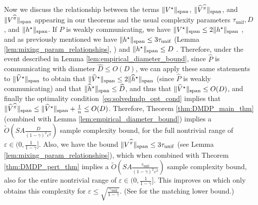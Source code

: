 \documentclass{article}
\theoremstyle{plain}
\theoremstyle{plain}
\theoremstyle{remark}
\theoremstyle{plain}
\theoremstyle{plain}
\newcommand{\Phat}{\widehat{P}}
\newcommand{\Vhat}{\widehat{V}}
\newcommand{\pihat}{\widehat{\pi}}
\newcommand{\hhat}{\widehat{h}}
\newcommand{\Otilde}{\widetilde{O}}
\newcommand{\tmix}{\tau_{\mathrm{unif}}}
\begin{document}
Now we discuss the relationship between the terms $\Vert V^\star\Vert _{\textnormal{span}}$, $\spannorm{\Vhat^{\pihat}}$, and $\spannorm{V^{\pihat}}$ appearing in our theorems and the usual complexity parameters $\tmix, D$, and $\Vert h^\star\Vert _{\textnormal{span}}$. If $P$ is weakly communicating, we have $\Vert V^\star\Vert _{\textnormal{span}} \leq 2\Vert h^\star\Vert _{\textnormal{span}}$ \citep[Lemma 2]{wei_model-free_2020}, and as previously mentioned we have $\spannorm{h^\star} \leq 3 \tmix$ (Lemma \ref{lem:mixing_param_relationships}, \cite{wang_near_2022}) and $\Vert h^\star\Vert _{\textnormal{span}} \leq D$ \citep{bartlett_regal_2012, lattimore_bandit_2020}. Therefore, under the event described in Lemma \ref{lem:empirical_diameter_bound}, since $\Phat$ is communicating with diameter $\widehat{D} \leq O(D)$, we can apply these same statements to $\spannorm{\Vhat^{\star}}$ to obtain that $\spannorm{\Vhat^{\star}} \leq 2\spannorm{\hhat^\star}$ (since $\Phat$ is weakly communicating) and that $\spannorm{\hhat^\star} \leq \widehat{D}$, and thus that $\spannorm{\Vhat^{\star}} \leq O(D)$, and finally the optimality condition~\eqref{eq:solvedmdp_opt_cond} implies that $\spannorm{\Vhat^{\pihat}} \leq \spannorm{\Vhat^{\star}} + \frac{1}{n} \leq O(D)$. Therefore, Theorem \ref{thm:DMDP_main_thm} (combined with Lemma \ref{lem:empirical_diameter_bound}) implies a $\Otilde\left(SA\frac{D}{(1-\gamma)^2\varepsilon^2} \right)$ sample complexity bound, for the full nontrivial range of $\varepsilon \in (0, \frac{1}{1-\gamma}]$.
Also, we have the bound $\spannorm{V^{\pihat}} \leq 3 \tmix$ (see Lemma \ref{lem:mixing_param_relationships}), which when combined with Theorem \ref{thm:DMDP_pert_thm} implies a $\Otilde\left(SA\frac{\tmix}{(1-\gamma)^2\varepsilon^2} \right)$ sample complexity bound, also for the entire nontrivial range of $\varepsilon \in (0, \frac{1}{1-\gamma}]$. This improves on \cite{wang_optimal_2023} which only obtains this complexity for $\varepsilon \leq \sqrt{\frac{\tmix}{1-\gamma}}$. (See \cite{wang_optimal_2023} for the matching lower bound.)
\end{document}
